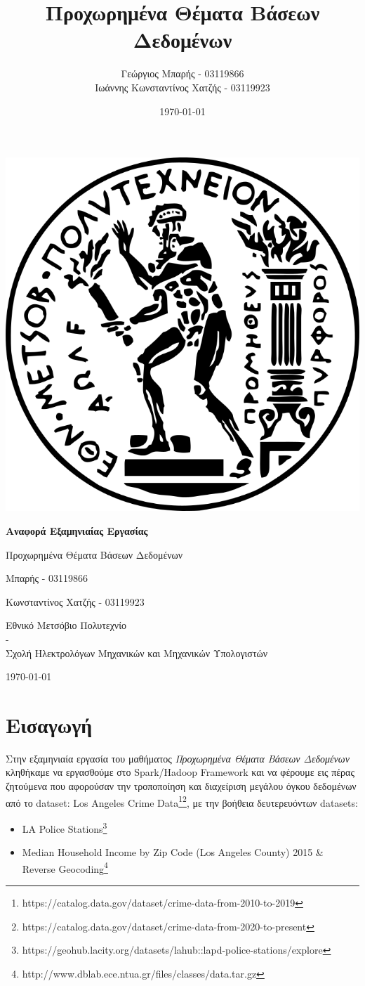 \documentclass{article}
\title{Προχωρημένα Θέματα Βάσεων Δεδομένων}
\author{Γεώργιος Μπαρής - 03119866\\Ιωάννης Κωνσταντίνος Χατζής - 03119923}
\date{\today}
\begin{document}
\begin{titlepage}
    \centering
    \vspace*{1cm}
    \includegraphics[width=0.45\linewidth]{pyrforos.png}
    \vspace{1.5cm}
    
    {\Huge\bfseries Αναφορά Εξαμηνιαίας Εργασίας\par}
    \vspace{0.3cm}
    {\Large Προχωρημένα Θέματα Βάσεων Δεδομένων\par}
    \vspace{1.5cm}
    {\Large {} Μπαρής - 03119866\par}
    {\Large {} Κωνσταντίνος Χατζής - 03119923\par}

    \vspace{1.5cm}
    {\Large Εθνικό Μετσόβιο Πολυτεχνίο\\-\\Σχολή Ηλεκτρολόγων Μηχανικών και Μηχανικών Υπολογιστών\par}
    \vfill
    {\large \today\par}
\end{titlepage}


\tableofcontents

\newpage

\section{Εισαγωγή}
Στην εξαμηνιαία εργασία του μαθήματος \textit{Προχωρημένα Θέματα Βάσεων Δεδομένων} κληθήκαμε να εργασθούμε στο Spark/Hadoop Framework  και να φέρουμε εις πέρας ζητούμενα που αφορούσαν την τροποποίηση και διαχείριση μεγάλου όγκου δεδομένων από το  {dataset: Los Angeles Crime Data}\footnote{https://catalog.data.gov/dataset/crime-data-from-2010-to-2019}\footnote{https://catalog.data.gov/dataset/crime-data-from-2020-to-present},  με την βοήθεια δευτερευόντων  datasets:
\begin{itemize}
    \item   LA Police Stations\footnote{https://geohub.lacity.org/datasets/lahub::lapd-police-stations/explore}
    \item   Median Household Income by Zip Code (Los Angeles County) 2015 \& Reverse Geocoding\footnote{http://www.dblab.ece.ntua.gr/files/classes/data.tar.gz} 
\end{itemize}
\end{document}

